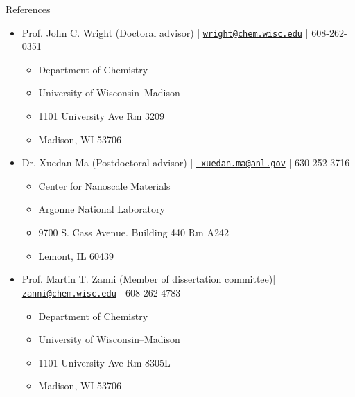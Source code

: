 \documentclass{resume} %
\begin{document}
\begin{rSection}{References}
	\begin{itemize}[leftmargin = 0 pt]
		\item Prof. John C. Wright (Doctoral advisor) | \href{mailto:wright@chem.wisc.edu}{\texttt{wright@chem.wisc.edu}} | 608-262-0351
		\begin{itemize}
			\item[] Department of Chemistry
			\item[] University of Wisconsin--Madison
			\item[] 1101 University Ave Rm 3209
			\item[] Madison, WI 53706
		\end{itemize}
		\item Dr. Xuedan Ma (Postdoctoral advisor) | \href{mailto: xuedan.ma@anl.gov}{\texttt{ xuedan.ma@anl.gov}} | 630-252-3716
		\begin{itemize}
			\item[] Center for Nanoscale Materials
			\item[] Argonne National Laboratory
			\item[] 9700 S. Cass Avenue. Building 440 Rm A242
			\item[] Lemont, IL 60439
		\end{itemize}	
		\item Prof. Martin T. Zanni (Member of dissertation committee)| \href{mailto:zanni@chem.wisc.edu}{\texttt{zanni@chem.wisc.edu}} | 608-262-4783
		\begin{itemize}
			\item[] Department of Chemistry
			\item[] University of Wisconsin--Madison
			\item[] 1101 University Ave Rm 8305L
			\item[] Madison, WI 53706
		\end{itemize}
		

\end{itemize}
\end{rSection}
\end{document}
